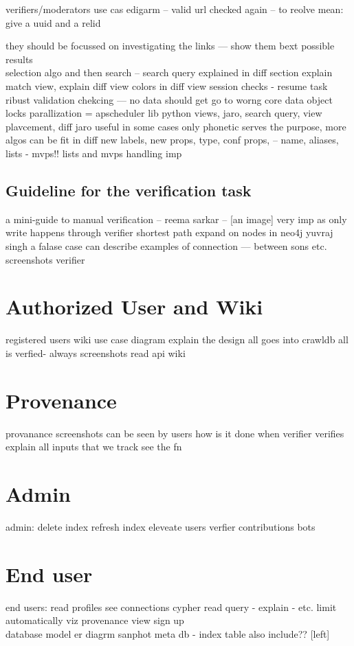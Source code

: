 verifiers/moderators 
use cas edigarm
-- valid url checked again --
to reolve mean: give a uuid and a relid 

they should be focussed on investigating the links --- show them bext possible results \\

selection algo
and then search -- search query explained in diff section
explain match view, explain diff view
colors in diff view
session checks - resume task
ribust validation chekcing --- no data should get go to worng core data object
locks parallization = apscheduler lib python
views, jaro, search query, view plavcement, diff
jaro useful in some cases only
phonetic serves the purpose, more algos can be fit in
diff new labels, new props, type, conf props, -- name, aliases, lists - mvps!! 
lists and mvps handling imp \\


\subsection{Guideline for the verification task}

a mini-guide to manual verification -- reema sarkar -- [an image]
very imp as only write happens through verifier
shortest path
expand on nodes in neo4j yuvraj singh a falase case can describe
examples of connection --- between sons etc. 
screenshots verifier \\
 

\section{Authorized User and Wiki}
registered users
wiki
use case diagram
explain the design all goes into crawldb
all is verfied- always 
screenshots
read api
wiki \\


\section{Provenance}

provanance
screenshots can be seen by users
how is it done
when verifier verifies
explain
all inputs that we track
see the fn \\

\section{Admin}
admin:
delete index
refresh index
eleveate users
verfier contributions
bots


\section{End user}
end users:
read profiles
see connections
cypher read query - explain - etc.
limit automatically
viz
provenance view
sign up\\

database model er diagrm sanphot meta db - index table also include?? [left] \\